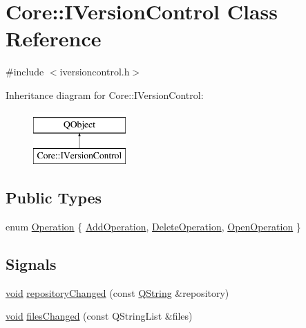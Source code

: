 \hypertarget{class_core_1_1_i_version_control}{\section{Core\-:\-:I\-Version\-Control Class Reference}
\label{class_core_1_1_i_version_control}
}


{\ttfamily \#include $<$iversioncontrol.\-h$>$}

Inheritance diagram for Core\-:\-:I\-Version\-Control\-:\begin{figure}[H]
\begin{center}
\leavevmode
\includegraphics[height=2.000000cm]{class_core_1_1_i_version_control}
\end{center}
\end{figure}
\subsection*{Public Types}
\begin{DoxyCompactItemize}
\item 
enum \hyperlink{group___core_plugin_gaf73287914241594ba6e179f65b63bd61}{Operation} \{ \hyperlink{group___core_plugin_ggaf73287914241594ba6e179f65b63bd61ab53ae2491f4fe42036cf680c3cc1b67b}{Add\-Operation}, 
\hyperlink{group___core_plugin_ggaf73287914241594ba6e179f65b63bd61ac0e72d90e10b995397b0c578ea5a3875}{Delete\-Operation}, 
\hyperlink{group___core_plugin_ggaf73287914241594ba6e179f65b63bd61a4afe4a1145dbcd2b6f7ebdda837ad06a}{Open\-Operation}
 \}
\end{DoxyCompactItemize}
\subsection*{Signals}
\begin{DoxyCompactItemize}
\item 
\hyperlink{group___u_a_v_objects_plugin_ga444cf2ff3f0ecbe028adce838d373f5c}{void} \hyperlink{group___core_plugin_ga762e65b1f740933d64ce68588d54d456}{repository\-Changed} (const \hyperlink{group___u_a_v_objects_plugin_gab9d252f49c333c94a72f97ce3105a32d}{Q\-String} \&repository)
\item 
\hyperlink{group___u_a_v_objects_plugin_ga444cf2ff3f0ecbe028adce838d373f5c}{void} \hyperlink{group___core_plugin_gaa10b98dc0dcebd4599492c770830a3bf}{files\-Changed} (const Q\-String\-List \&files)
\end{DoxyCompactItemize}
